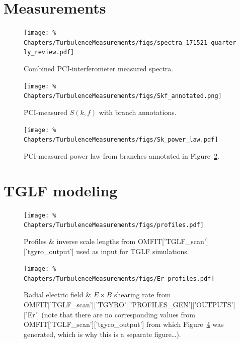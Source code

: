 \section{Measurements}
\begin{figure}[h!]
  \centering
  \texttt{[image: \%
    Chapters/TurbulenceMeasurements/figs/spectra\_171521\_quarterly\_review.pdf]}
  \caption[Combined PCI-interferometer measured spectra]{%
    Combined PCI-interferometer measured spectra.
  }
\label{fig:TurbulenceMeasurements:spectra_quarterly_review}
\end{figure}

\begin{figure}[h!]
  \centering
  \texttt{[image: \%
    Chapters/TurbulenceMeasurements/figs/Skf\_annotated.png]}
  \caption[PCI-measured $S(k, f)$ with branch annotations]{%
    PCI-measured $S(k, f)$ with branch annotations.
  }
\label{fig:TurbulenceMeasurements:Skf_annotated}
\end{figure}

\begin{figure}[h!]
  \centering
  \texttt{[image: \%
    Chapters/TurbulenceMeasurements/figs/Sk\_power\_law.pdf]}
  \caption[PCI-measured power law]{%
    PCI-measured power law from branches annotated in
    Figure~\ref{fig:TurbulenceMeasurements:Skf_annotated}.
  }
\label{fig:TurbulenceMeasurements:Sk_power_law}
\end{figure}


\section{TGLF modeling}
\begin{figure}[h!]
  \centering
  \texttt{[image: \%
    Chapters/TurbulenceMeasurements/figs/profiles.pdf]}
  \caption[Profiles \& inverse scale lengths]{%
    Profiles \& inverse scale lengths from
    OMFIT['TGLF\_scan']['tgyro\_output']
    used as input for TGLF simulations.
  }
\label{fig:TurbulenceMeasurements:profiles}
\end{figure}

\begin{figure}[h!]
  \centering
  \texttt{[image: \%
    Chapters/TurbulenceMeasurements/figs/Er\_profiles.pdf]}
  \caption[Radial electric field \& $E \times B$ shearing rate]{%
    Radial electric field \& $E \times B$ shearing rate from
    OMFIT['TGLF\_scan']['TGYRO']['PROFILES\_GEN']['OUTPUTS']['Er']
    (note that there are no corresponding values from
    OMFIT['TGLF\_scan']['tgyro\_output']
    from which Figure~\ref{fig:TurbulenceMeasurements:profiles}
    was generated, which is why this is a separate figure\ldots).
  }
\label{fig:TurbulenceMeasurements:Er_profiles}
\end{figure}

